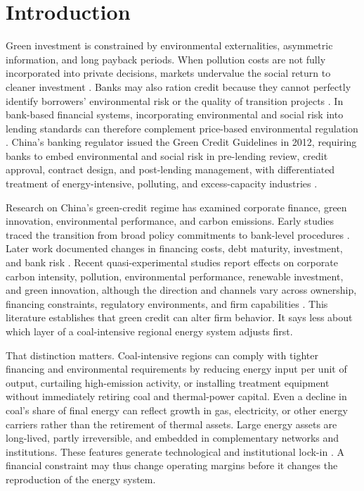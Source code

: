 \documentclass[11pt]{article}
\begin{document}
\section{Introduction}

Green investment is constrained by environmental externalities, asymmetric information, and long payback periods. When pollution costs are not fully incorporated into private decisions, markets undervalue the social return to cleaner investment \parencite{pigou1920}. Banks may also ration credit because they cannot perfectly identify borrowers' environmental risk or the quality of transition projects \parencite{stiglitzweiss1981}. In bank-based financial systems, incorporating environmental and social risk into lending standards can therefore complement price-based environmental regulation \parencite{campiglio2016,dikauvolz2021}. China's banking regulator issued the Green Credit Guidelines in 2012, requiring banks to embed environmental and social risk in pre-lending review, credit approval, contract design, and post-lending management, with differentiated treatment of energy-intensive, polluting, and excess-capacity industries \parencite{cbrc2012}.

Research on China's green-credit regime has examined corporate finance, green innovation, environmental performance, and carbon emissions. Early studies traced the transition from broad policy commitments to bank-level procedures \parencite{aizawayang2010,zhangyangbi2011}. Later work documented changes in financing costs, debt maturity, investment, and bank risk \parencite{cuietal2018,xuli2020}. Recent quasi-experimental studies report effects on corporate carbon intensity, pollution, environmental performance, renewable investment, and green innovation, although the direction and channels vary across ownership, financing constraints, regulatory environments, and firm capabilities \parencite{heetal2019,xuyetal2023,wuetal2023,zhangetal2024green,laietal2024,lietal2024,pengetal2024,machen2025,zhengetal2025,zhangetal2025micro}. This literature establishes that green credit can alter firm behavior. It says less about which layer of a coal-intensive regional energy system adjusts first.

That distinction matters. Coal-intensive regions can comply with tighter financing and environmental requirements by reducing energy input per unit of output, curtailing high-emission activity, or installing treatment equipment without immediately retiring coal and thermal-power capital. Even a decline in coal's share of final energy can reflect growth in gas, electricity, or other energy carriers rather than the retirement of thermal assets. Large energy assets are long-lived, partly irreversible, and embedded in complementary networks and institutions. These features generate technological and institutional lock-in \parencite{arthur1989,david1985,unruh2000}. A financial constraint may thus change operating margins before it changes the reproduction of the energy system.
\end{document}
